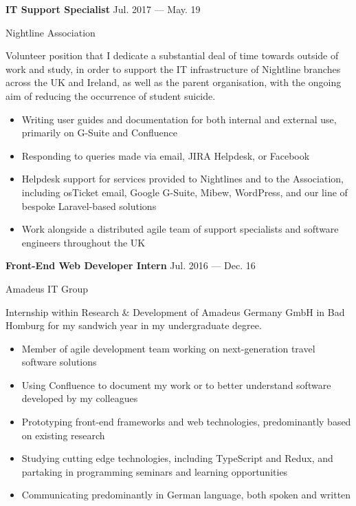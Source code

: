 \parbox[t][][t]{\linewidth}{
	\parbox{\linewidth}{{\textbf{IT Support Specialist}}
		\hfill {{Jul. 2017 --- May. 19}}}
	\smallbreak
	
	\parbox{\linewidth}{Nightline Association}
	
	\bigskip
	Volunteer position that I dedicate a substantial deal of time towards outside of work and study, in order to support the IT infrastructure of Nightline branches across the UK and Ireland, as well as the parent organisation, with the ongoing aim of reducing the occurrence of student suicide.
	
	\bigskip
	\begin{itemize}
		\item{Writing user guides and documentation for both internal and external use, primarily on G-Suite and Confluence}\\[-.6em]
		\item{Responding to queries made via email, JIRA Helpdesk, or Facebook}\\[-.6em]
		\item{Helpdesk support for services provided to Nightlines and to the Association, including osTicket email, Google G-Suite, Mibew, WordPress, and our line of bespoke Laravel-based solutions}\\[-.6em]
		\item{Work alongside a distributed agile team of support specialists and software engineers throughout the UK}\\[-.6em]
		\bigskip
		\bigskip
	\end{itemize}
}

\parbox[t][][t]{\linewidth}{
	\parbox{\linewidth}{{\textbf{Front-End Web Developer Intern}}
		\hfill {{Jul. 2016 --- Dec. 16}}}
	\smallbreak
	
	\parbox{\linewidth}{Amadeus IT Group}
	
	\bigskip
	Internship within Research \& Development of Amadeus Germany GmbH in Bad Homburg for my sandwich year in my undergraduate degree.
	
	\bigskip
	\begin{itemize}
		\item{Member of agile development team working on next-generation travel software solutions}\\[-.6em]
		\item{Using Confluence to document my work or to better understand software developed by my colleagues}\\[-.6em]
		\item{Prototyping front-end frameworks and web technologies, predominantly based on existing research}\\[-.6em]
		\item{Studying cutting edge technologies, including TypeScript and Redux, and partaking in programming seminars and learning opportunities}\\[-.6em]
		\item{Communicating predominantly in German language, both spoken and written}\\[-.6em]
	\end{itemize}
}

